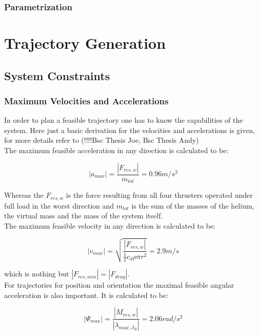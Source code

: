 \subsubsection{Parametrization}

\section{Trajectory Generation}
\label{sec:trajectoryGeneration}
\subsection{System Constraints}
\subsubsection{Maximum Velocities and Accelerations}
In order to plan a feasible trajectory one has to know the capabilities of the system. Here just a basic derivation for the velocities and accelerations is given, for more details refer to (!!!!Bsc Thesis Joe, Bsc Thesis Andy)\\

The maximum feasible acceleration in any direction is calculated to be:

\begin{equation}
  \left|a_{max} \right| =  \frac{\left|F_{res, w}\right|}{m_{tot}} = 0.96 m/s^2
\end{equation}

Whereas the $F_{res,w}$ is the force resulting from all four thrusters operated under full load in the worst direction and $m_{tot}$ is the sum of the masses of the helium, the virtual mass and the mass of the system itself.\\


The maximum feasible velocity in any direction is calculated to be:

\begin{equation}
\left|v_{max} \right| = \sqrt{\frac{\left|F_{res,w} \right|}{\frac{1}{2}c_d \rho \pi r^2}}=2.9 m/s
\end{equation}

which is nothing but $ \left|F_{res,min} \right| = \left|F_{dray} \right| $.\\

For trajectories for position and orientation the maximal feasible angular acceleration is also important. It is calculated to be:

\begin{equation}
  \left|\Psi_{max} \right| =  \frac{\left|M_{res,w}\right|}{\left| \lambda_{max, J_{B}} \right|} = 2.06 rad/s^2 
\end{equation}

